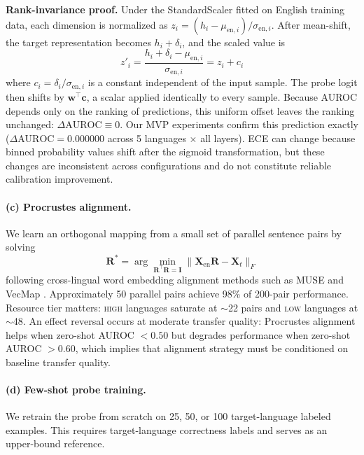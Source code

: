 \textbf{Rank-invariance proof.} Under the StandardScaler fitted on English training data, each dimension is normalized as $z_i = (h_i - \mu_{\text{en},i}) / \sigma_{\text{en},i}$. After mean-shift, the target representation becomes $h_i + \delta_i$, and the scaled value is
\begin{equation}
  z'_i = \frac{h_i + \delta_i - \mu_{\text{en},i}}{\sigma_{\text{en},i}} = z_i + c_i
  \label{eq:meanshift}
\end{equation}
where $c_i = \delta_i / \sigma_{\text{en},i}$ is a constant independent of the input sample. The probe logit then shifts by $\mathbf{w}^\top \mathbf{c}$, a scalar applied identically to every sample. Because AUROC depends only on the ranking of predictions, this uniform offset leaves the ranking unchanged: $\Delta\text{AUROC} \equiv 0$. Our MVP experiments confirm this prediction exactly ($\Delta\text{AUROC} = 0.000000$ across 5 languages $\times$ all layers). ECE can change because binned probability values shift after the sigmoid transformation, but these changes are inconsistent across configurations and do not constitute reliable calibration improvement.

\paragraph{(c) Procrustes alignment.} We learn an orthogonal mapping from a small set of parallel sentence pairs by solving
\begin{equation}
  \mathbf{R}^* = \arg\min_{\mathbf{R}^\top\mathbf{R}=\mathbf{I}} \|\mathbf{X}_{\text{en}}\mathbf{R} - \mathbf{X}_t\|_F
  \label{eq:procrustes}
\end{equation}
following cross-lingual word embedding alignment methods such as MUSE \citep{conneau2018muse} and VecMap \citep{artetxe2018vecmap}. %
Approximately 50 parallel pairs achieve 98\% of 200-pair performance. Resource tier matters: \textsc{high} languages saturate at ${\sim}$22 pairs and \textsc{low} languages at ${\sim}$48. An effect reversal occurs at moderate transfer quality: Procrustes alignment helps when zero-shot AUROC $< 0.50$ but degrades performance when zero-shot AUROC $> 0.60$, which implies that alignment strategy must be conditioned on baseline transfer quality.

\paragraph{(d) Few-shot probe training.} We retrain the probe from scratch on 25, 50, or 100 target-language labeled examples. This requires target-language correctness labels and serves as an upper-bound reference.


